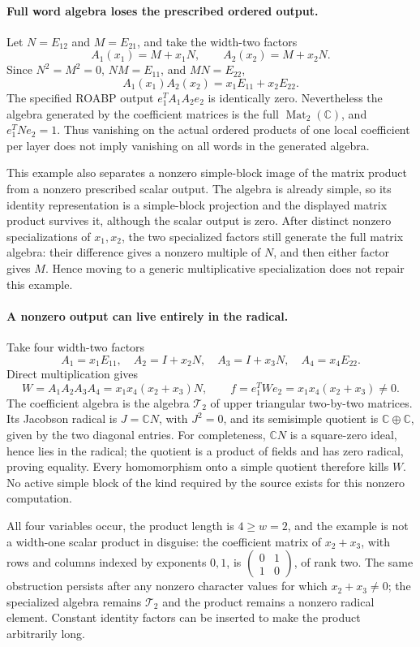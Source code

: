 \documentclass[11pt,a4paper]{article}
\theoremstyle{definition}\newtheorem{definition}{Definition}
\begin{document}
\paragraph{Full word algebra loses the prescribed ordered output.}
Let $N=E_{12}$ and $M=E_{21}$, and take the width-two factors
\[
 A_1(x_1)=M+x_1N,\qquad A_2(x_2)=M+x_2N.
\]
Since $N^2=M^2=0$, $NM=E_{11}$, and $MN=E_{22}$,
\[
 A_1(x_1)A_2(x_2)=x_1E_{11}+x_2E_{22}.
\]
The specified ROABP output $e_1^TA_1A_2e_2$ is identically zero.
Nevertheless the algebra generated by the coefficient matrices
is the full $\operatorname{Mat}_2(\mathbb C)$, and
$e_1^TNe_2=1$.  Thus vanishing on the actual ordered products
of one local coefficient per layer does not imply vanishing on
all words in the generated algebra.

This example also separates a nonzero simple-block image of the
matrix product from a nonzero prescribed scalar output.  The
algebra is already simple, so its identity representation is a
simple-block projection and the displayed matrix product survives
it, although the scalar output is zero.  After distinct nonzero
specializations of $x_1,x_2$, the two specialized factors still
generate the full matrix algebra: their difference gives a
nonzero multiple of $N$, and then either factor gives $M$.
Hence moving to a generic multiplicative specialization does not
repair this example.

\paragraph{A nonzero output can live entirely in the radical.}
Take four width-two factors
\[
 A_1=x_1E_{11},\quad A_2=I+x_2N,\quad
 A_3=I+x_3N,\quad A_4=x_4E_{22}.
\]
Direct multiplication gives
\[
 W=A_1A_2A_3A_4=x_1x_4(x_2+x_3)N,\qquad
 f=e_1^TWe_2=x_1x_4(x_2+x_3)\ne0.
 \tag{I.27}
\]
The coefficient algebra is the algebra $\mathcal T_2$ of upper
triangular two-by-two matrices.  Its Jacobson radical is
$J=\mathbb C N$, with $J^2=0$, and its semisimple quotient is
$\mathbb C\oplus\mathbb C$, given by the two diagonal entries.
For completeness, $\mathbb C N$ is a square-zero ideal, hence
lies in the radical; the quotient is a product of fields and
has zero radical, proving equality.  Every homomorphism onto
a simple quotient therefore kills $W$.  No active simple block
of the kind required by the source exists for this nonzero
computation.

All four variables occur, the product length is $4\ge w=2$,
and the example is not a width-one scalar product in disguise:
the coefficient matrix of $x_2+x_3$, with rows and columns
indexed by exponents $0,1$, is
$\left(\begin{smallmatrix}0&1\\1&0\end{smallmatrix}\right)$,
of rank two.  The same obstruction persists after any nonzero
character values for which $x_2+x_3\ne0$; the specialized
algebra remains $\mathcal T_2$ and the product remains a
nonzero radical element.  Constant identity factors can be
inserted to make the product arbitrarily long.
\end{document}
